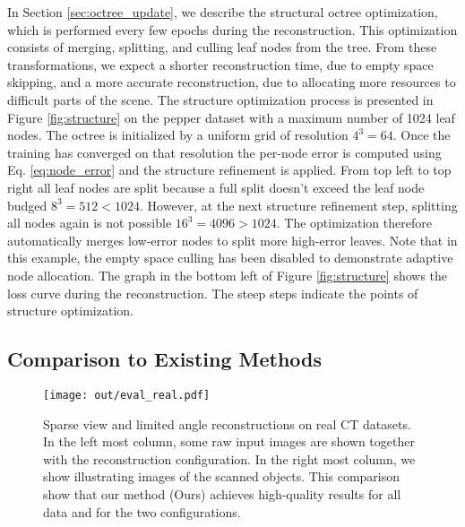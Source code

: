 \documentclass[acmtog,nonacm]{acmart} \acmSubmissionID{0438}
\begin{document}
In Section \ref{sec:octree_update}, we describe the structural octree optimization, which is performed every few epochs during the reconstruction.
This optimization consists of merging, splitting, and culling leaf nodes from the tree.
From these transformations, we expect a shorter reconstruction time, due to empty space skipping, and a more accurate reconstruction, due to allocating more resources to difficult parts of the scene.
The structure optimization process is presented in Figure \ref{fig:structure} on the pepper dataset with a maximum number of 1024 leaf nodes.
The octree is initialized by a uniform grid of resolution $4^3=64$.
Once the training has converged on that resolution the per-node error is computed using Eq. \eqref{eq:node_error} and the structure refinement is applied.
From top left to top right all leaf nodes are split because a full split doesn't exceed the leaf node budged $8^3 = 512 < 1024$.
However, at the next structure refinement step, splitting all nodes again is not possible $16^3 = 4096 > 1024$.
The optimization therefore automatically merges low-error nodes to split more high-error leaves.
Note that in this example, the empty space culling has been disabled to demonstrate adaptive node allocation.
The graph in the bottom left of Figure \ref{fig:structure} shows the loss curve during the reconstruction.
The steep steps indicate the points of structure optimization.


\subsection{Comparison to Existing Methods}


\begin{figure*}
\texttt{[image: out/eval\_real.pdf]}
	\caption{
		Sparse view and limited angle reconstructions on real CT datasets.
		In the left most column, some raw input images are shown together with the reconstruction configuration.
		In the right most column, we show illustrating images of the scanned objects.
		This comparison show that our method (Ours) achieves high-quality results for all data and for the two configurations.
	}
	\label{fig:real_recons}
\end{figure*}
\end{document}
